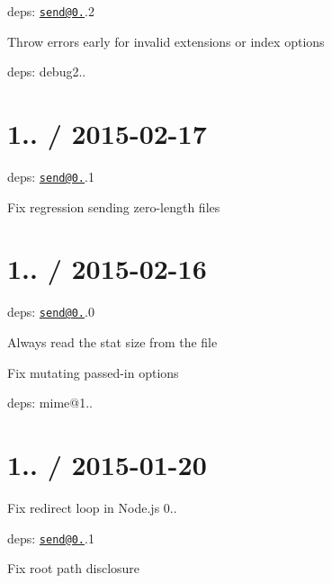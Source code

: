 
\begin{DoxyItemize}
\item deps\+: \href{mailto:send@0.12}{\tt send@0.}.2
\begin{DoxyItemize}
\item Throw errors early for invalid {\ttfamily extensions} or {\ttfamily index} options
\item deps\+: debug2..
\end{DoxyItemize}
\end{DoxyItemize}

\section*{1.. / 2015-\/02-\/17 }


\begin{DoxyItemize}
\item deps\+: \href{mailto:send@0.12}{\tt send@0.}.1
\begin{DoxyItemize}
\item Fix regression sending zero-\/length files
\end{DoxyItemize}
\end{DoxyItemize}

\section*{1.. / 2015-\/02-\/16 }


\begin{DoxyItemize}
\item deps\+: \href{mailto:send@0.12}{\tt send@0.}.0
\begin{DoxyItemize}
\item Always read the stat size from the file
\item Fix mutating passed-\/in {\ttfamily options}
\item deps\+: mime@1..
\end{DoxyItemize}
\end{DoxyItemize}

\section*{1.. / 2015-\/01-\/20 }


\begin{DoxyItemize}
\item Fix redirect loop in Node.\+js 0..
\item deps\+: \href{mailto:send@0.11}{\tt send@0.}.1
\begin{DoxyItemize}
\item Fix root path disclosure
\end{DoxyItemize}
\end{DoxyItemize}

